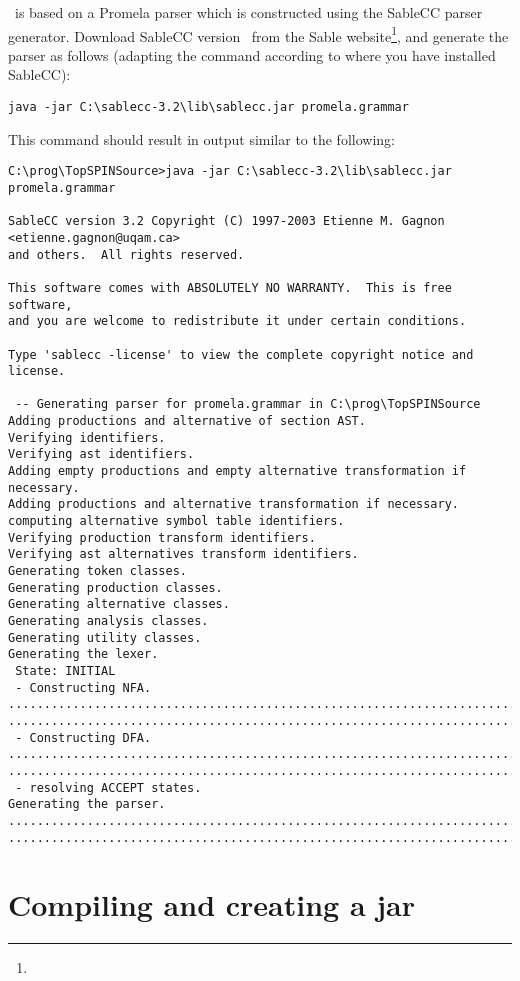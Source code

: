 \topspin\ is based on a Promela parser which is constructed using
the SableCC parser generator.  Download SableCC version
\sableccversion\ from the Sable
website\footnote{\texttt{\sableccwebsite}}, and generate the parser
as follows (adapting the command according to where you have
installed SableCC):
%
\begin{lstlisting}
java -jar C:\sablecc-3.2\lib\sablecc.jar promela.grammar
\end{lstlisting}
%
This command should result in output similar to the following:
%
\begin{lstlisting}
C:\prog\TopSPINSource>java -jar C:\sablecc-3.2\lib\sablecc.jar
promela.grammar

SableCC version 3.2 Copyright (C) 1997-2003 Etienne M. Gagnon <etienne.gagnon@uqam.ca>
and others.  All rights reserved.

This software comes with ABSOLUTELY NO WARRANTY.  This is free software,
and you are welcome to redistribute it under certain conditions.

Type 'sablecc -license' to view the complete copyright notice and license.

 -- Generating parser for promela.grammar in C:\prog\TopSPINSource
Adding productions and alternative of section AST.
Verifying identifiers.
Verifying ast identifiers.
Adding empty productions and empty alternative transformation if necessary.
Adding productions and alternative transformation if necessary.
computing alternative symbol table identifiers.
Verifying production transform identifiers.
Verifying ast alternatives transform identifiers.
Generating token classes.
Generating production classes.
Generating alternative classes.
Generating analysis classes.
Generating utility classes.
Generating the lexer.
 State: INITIAL
 - Constructing NFA.
..............................................................................
..............................................................................
 - Constructing DFA.
..............................................................................
..............................................................................
 - resolving ACCEPT states.
Generating the parser.
..............................................................................
..............................................................................
\end{lstlisting}

\section{Compiling and creating a jar}\label{sec:compilingfromsource:compiling}

